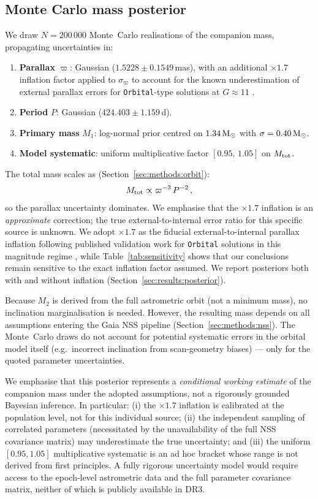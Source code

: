 \documentclass[usenatbib,fleqn]{mnras}
\newcommand{\Msun}{{\rm M}_\odot}
\begin{document}
\subsection{Monte Carlo mass posterior}
\label{sec:methods:mc}

We draw $N = 200\,000$ Monte~Carlo realisations of the companion
mass, propagating uncertainties in:
\begin{enumerate}
\item \textbf{Parallax} $\varpi$: Gaussian ($1.5228 \pm 0.1549$\,mas),
  with an additional $\times 1.7$ inflation factor applied to
  $\sigma_\varpi$ to account for the known underestimation of
  external parallax errors for \texttt{Orbital}-type solutions at
  $G \approx 11$ \citep{ElBadry2024}.
\item \textbf{Period} $P$: Gaussian ($424.403 \pm 1.159$\,d).
\item \textbf{Primary mass} $M_1$: log-normal prior centred on
  $1.34\,\Msun$ with $\sigma = 0.40\,\Msun$.
\item \textbf{Model systematic}: uniform multiplicative factor
  $[0.95,\,1.05]$ on $M_{\rm tot}$.
\end{enumerate}
The total mass scales as (Section~\ref{sec:methods:orbit}):
\begin{equation}
M_{\rm tot} \propto \varpi^{-3}\,P^{-2}\,,
\label{eq:scaling}
\end{equation}
so the parallax uncertainty dominates.  We emphasise that the
$\times 1.7$ inflation is an \emph{approximate} correction;
the true external-to-internal error ratio for this specific
source is unknown.  We adopt $\times 1.7$ as the fiducial external-to-internal
parallax inflation following published validation work for
\texttt{Orbital} solutions in this magnitude regime
\citep{ElBadry2024}, while Table~\ref{tab:sensitivity} shows
that our conclusions remain sensitive to the exact inflation
factor assumed.  We report posteriors both with and without
inflation (Section~\ref{sec:results:posterior}).

Because $M_2$ is derived from the full astrometric orbit (not a
minimum mass), no inclination marginalisation is needed.  However,
the resulting mass depends on all assumptions entering
the Gaia NSS pipeline (Section~\ref{sec:methods:nss}).  The
Monte~Carlo draws do not account for potential systematic errors
in the orbital model itself (e.g.\ incorrect inclination from
scan-geometry biases) --- only for the quoted parameter
uncertainties.

We emphasise that this posterior represents a \emph{conditional
working estimate} of the companion mass under the adopted
assumptions, not a rigorously grounded Bayesian inference.  In
particular: (i) the $\times 1.7$ inflation is calibrated at the
population level, not for this individual source; (ii) the
independent sampling of correlated parameters (necessitated by
the unavailability of the full NSS covariance matrix) may
underestimate the true uncertainty; and (iii) the uniform
$[0.95, 1.05]$ multiplicative systematic is an ad hoc bracket
whose range is not derived from first principles.  A fully
rigorous uncertainty model would require access to the epoch-level
astrometric data and the full parameter covariance matrix, neither
of which is publicly available in DR3.
\end{document}

